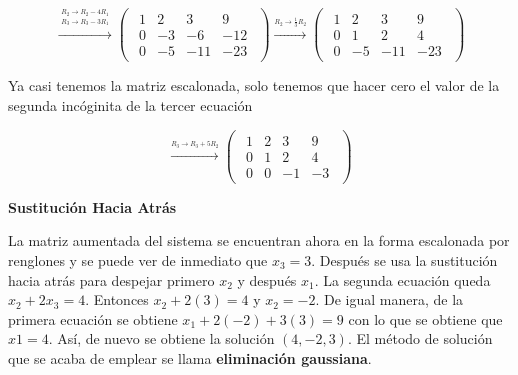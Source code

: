 \documentclass{article}
\begin{document}
\begin{equation*}
    \xrightarrow{\overset{\begin{aligned} R_2 \rightarrow R_2 - 4R_1 \\ R_3 \rightarrow R_3 - 3R_1\end{aligned}}{}} 
    \begin{pmatrix}
        \begin{array}{rrr|r}
            1& 2 & 3 & 9\\
            0 &-3 &-6 &-12 \\
            0&-5 &-11 &-23
        \end{array}
    \end{pmatrix}
    \xrightarrow{\stackrel{R_2 \rightarrow \frac{1}{3}R_2}{}}
    \begin{pmatrix}
        \begin{array}{rrr|r}
            1 & 2 & 3 & 9\\
            0 & 1 & 2 & 4\\
            0 & -5 &-11&-23
        \end{array}
    \end{pmatrix}
\end{equation*}

Ya casi tenemos la matriz escalonada, solo tenemos que hacer cero el valor de la segunda incóginita de la tercer ecuación

\begin{equation*}
    \xrightarrow{\overset{R_3 \rightarrow R_3 + 5R_2}{}} 
    \begin{pmatrix}
        \begin{array}{rrr|r}
            1 & 2 & 3 & 9\\
            0 & 1 & 2 & 4 \\
            0 & 0 &-1 &-3
        \end{array}
    \end{pmatrix}
\end{equation*}

\begin{large}
    \textbf{Sustitución Hacia Atrás}
\end{large}

La matriz aumentada del sistema se encuentran ahora en la forma escalonada por renglones y se puede ver de inmediato que $x_3 = 3$. Después se usa la sustitución hacia atrás para despejar primero $x_2$ y después $x_1$. La segunda ecuación queda $x_2 + 2x_3 = 4$. Entonces $x_2 + 2(3) = 4$ y $x_2 =-2$. De igual manera, de la primera ecuación se obtiene $x_1 + 2(-2) + 3(3) = 9$  con lo que se obtiene que $x1 = 4$. Así, de nuevo se obtiene la solución $(4, -2, 3)$. El método de solución que se acaba de emplear se llama \textbf{eliminación gaussiana}.
\end{document}

